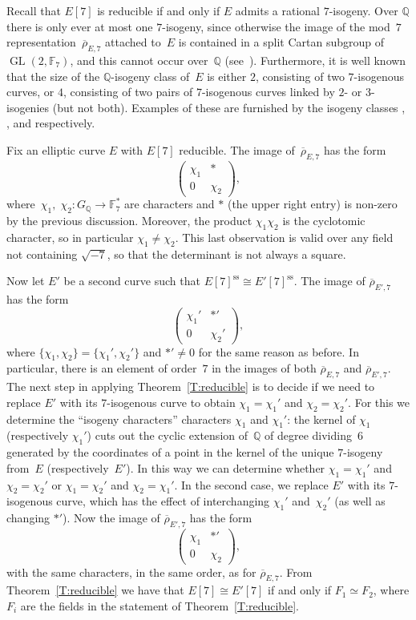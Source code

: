 \documentclass[12pt]{amsart}
\newcommand{\lmfdbeciso}[2]{\href{http://www.lmfdb.org/EllipticCurve/Q/#1/#2}{\text{\rm#1#2}}}
\newcommand{\F}{\mathbb{F}}
\newcommand{\Q}{\mathbb{Q}}
\newcommand{\rhobar}{{\overline{\rho}}}
\DeclareMathOperator{\sss}{ss}
\newcommand{\GL}{\operatorname{GL}}
\numberwithin{equation}{section}
\theoremstyle{definition}
\theoremstyle{remark}
\begin{document}
Recall that $E[7]$ is reducible if and only if $E$ admits a rational
$7$-isogeny.  Over $\Q$ there is only ever at most one $7$-isogeny,
since otherwise the image of the mod~$7$
representation~$\rhobar_{E,7}$ attached to~$E$ is contained in a split
Cartan subgroup of $\GL(2,\F_7)$, and this cannot occur over~$\Q$
(see~\cite[Theorem~1.1]{GL}).  Furthermore, it is well known that the
size of the $\Q$-isogeny class of~$E$ is either $2$, consisting of two
$7$-isogenous curves, or $4$, consisting of two pairs of $7$-isogenous
curves linked by $2$-{} or $3$-isogenies (but not both). Examples of
these are furnished by the isogeny classes \lmfdbeciso{26}{b},
\lmfdbeciso{49}{a}, and \lmfdbeciso{162}{b} respectively.

Fix an elliptic curve $E$ with $E[7]$ reducible. 
The image
of~$\rhobar_{E,7}$ has the form
\[
  \begin{pmatrix}\chi_1&*\\0&\chi_2  \end{pmatrix},
\]
where~$\chi_1, \; \chi_2 : G_{\Q}\to\F_7^*$ are characters and $*$
(the upper right entry) is non-zero by the previous
discussion. Moreover, the product $\chi_1\chi_2$ is the cyclotomic
character, so in particular $\chi_1\not=\chi_2$. This last observation
is valid over any field not containing $\sqrt{-7}$, so that the
determinant is not always a square.

Now let $E'$ be a second curve such that $E[7]^{\sss}\cong
E'[7]^{\sss}$. 
The image of $\rhobar_{E',7}$ has the form
\[
  \begin{pmatrix}\chi_1'&*'\\0&\chi_2'  \end{pmatrix},
  \]
where $\{\chi_1,\chi_2\}=\{\chi_1',\chi_2'\}$ and $*' \neq 0$ for the
same reason as before.  In particular, there is an element of
order~$7$ in the images of both $\rhobar_{E,7}$ and $\rhobar_{E',7}$.
The next step in applying Theorem~\ref{T:reducible} is to decide if we
need to replace $E'$ with its $7$-isogenous curve to obtain
$\chi_1=\chi_1'$ and $\chi_2=\chi_2'$. For this we determine the
``isogeny characters'' characters $\chi_1$ and $\chi_1'$: the kernel
of $\chi_1$ (respectively $\chi_1'$) cuts out the cyclic extension
of~$\Q$ of degree dividing~$6$ generated by the coordinates of a point
in the kernel of the unique $7$-isogeny from~$E$ (respectively~$E'$).
In this way we can determine whether $\chi_1=\chi_1'$ and
$\chi_2=\chi_2'$ or $\chi_1=\chi_2'$ and $\chi_2=\chi_1'$.  In the
second case, we replace $E'$ with its $7$-isogenous curve, which has
the effect of interchanging $\chi_1'$ and~$\chi_2'$ (as well as
changing $*'$).  Now the image of $\rhobar_{E',7}$ has the form
\[
\begin{pmatrix}\chi_1&*'\\0&\chi_2  \end{pmatrix},
\]
with the same characters, in the same order, as for
$\rhobar_{E,7}$. From Theorem~\ref{T:reducible} we have that
$E[7]\cong E'[7]$ if and only if $F_1 \simeq F_2$, where $F_i$ are the
fields in the statement of Theorem~\ref{T:reducible}.
\end{document}
